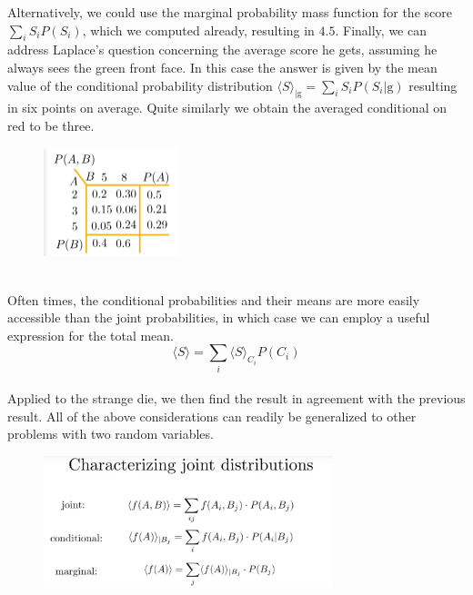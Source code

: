\documentclass[12pt, a4paper]{scrartcl}
\begin{document}
Alternatively, we could use the marginal probability mass function for the score $\sum_iS_iP(S_i)$, which we computed already, resulting in $4.5$.
Finally, we can address Laplace’s question concerning the average score he gets, assuming he always sees the green front face. In this case the answer is given by the mean value of the conditional probability distribution $\langle S \rangle _{|\text{g}} = \sum_iS_iP(S_i|\text{g})$ resulting in six points on average.
Quite similarly we obtain the averaged conditional on red to be three.\\
\begin{figure}[H]
	\centering
	\includegraphics[width=0.35\textwidth]{3_9.png}
\end{figure}
\\
Often times, the conditional probabilities and their means are more easily accessible than the joint probabilities, in which case we can employ a useful expression for the total mean.
\begin{equation*}\boxed{\langle S\rangle= \sum_{i}\langle S\rangle_{C_i}P(C_i)}\end{equation*}\\
Applied to the strange die, we then find the result in agreement with the previous result.
All of the above considerations can readily be generalized to other problems with two random variables.\\%
\begin{figure}[H]
	\centering
	\includegraphics[width=0.75\textwidth]{3_10.png}
\end{figure}
\end{document}
